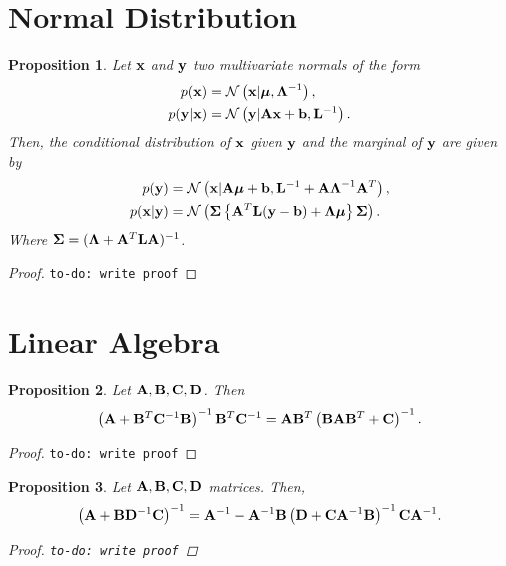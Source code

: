 \documentclass[11pt]{article}
\numberwithin{equation}{section}
\newcommand{\x}{{\bf x}}
\newcommand{\N}{\mathcal{N}}
\newtheorem{proposition}{Proposition}[section]
\begin{document}
\section{Normal Distribution}
\begin{proposition} \label{prop:multivariate-normal-combination}
	Let $\x$ and ${\bf y}$ two multivariate normals of the form
	\begin{align}
		p(\x) &= \N\left(\x \vert \boldsymbol\mu, \boldsymbol\Lambda^{-1}\right),\\
		p({\bf y} \vert \x ) &= \N\left({\bf y} \vert {\bf A}\x + {\bf b}, {\bf L}^{-1}\right).
	\end{align}
	Then, the conditional distribution of $\x$ given ${\bf y}$ and the marginal of ${\bf y}$ are given by
	\begin{align}
		p({\bf y}) &= \N\left(\x\vert {\bf A}\boldsymbol\mu + {\bf b}, {\bf L}^{-1} + {\bf A}\boldsymbol\Lambda^{-1}{\bf A}^T\right), \label{eq:normal-marginal}\\
		p(\x \vert {\bf y}) &= \N\left(\boldsymbol\Sigma\left\{{\bf A}^T {\bf L}({\bf y} - {\bf b})  + \boldsymbol\Lambda\boldsymbol\mu \right\} \boldsymbol\Sigma\right) \label{eq:normal-conditional}.
	\end{align}
	Where $\boldsymbol{\Sigma} = (\boldsymbol\Lambda + {\bf A}^T {\bf L} {\bf A})^{-1}$.
\end{proposition}

\begin{proof}
	\texttt{to-do: write proof}
\end{proof}

\section{Linear Algebra}

\begin{proposition} \label{prop:matrix-rewrite1}
	Let ${\bf A}, {\bf B}, {\bf C}, {\bf D}$. Then
	\begin{equation}
		\left({\bf A} + {\bf B}^T {\bf C}^{-1} {\bf B}\right)^{-1}{\bf B}^T {\bf C}^{-1} = {\bf A}{\bf B}^T\left({\bf B}{\bf A}{\bf B}^T + {\bf C}\right)^{-1}.
	\end{equation}
\end{proposition}

\begin{proof}
	\texttt{to-do: write proof}
\end{proof}

\begin{proposition} \label{prop:woodbury-identity}
	Let ${\bf A}, {\bf B}, {\bf C}, {\bf D}$ matrices. Then,
	\begin{equation}
		\left({\bf A} + {\bf B} {\bf D}^{-1}{\bf C}\right)^{-1} = {\bf A}^{-1} - {\bf A}^{-1}{\bf B}\left({\bf D} + {\bf C}{\bf A}^{-1}{\bf B}\right)^{-1}{\bf C}{\bf A}^{-1}.
	\end{equation}
	\begin{proof}
		\texttt{to-do: write proof}
	\end{proof}
\end{proposition}


\end{document}
